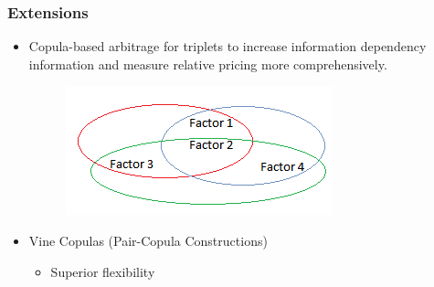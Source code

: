 \documentclass[pdf,9pt,xcolor=dvipsnames,hide notes]{beamer}
\begin{document}
\begin{frame}
	\frametitle{Extensions}
	
\begin{itemize}
	
	
	\item Copula-based arbitrage for triplets to increase information dependency information and measure relative pricing more comprehensively.
	
	
		\begin{figure}[htbp]
		\centering
		\includegraphics[scale=0.6]{fig4.png}
		\label{fig:fig4}
	\end{figure}

	\item Vine Copulas (Pair-Copula Constructions)
	
	\begin{itemize}
		\item Superior flexibility
	\end{itemize}
	
\end{itemize}
	
\end{frame}
\end{document}
